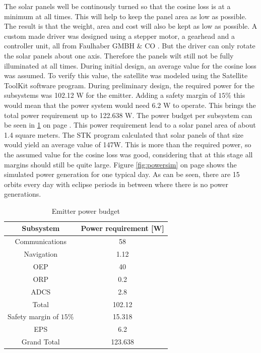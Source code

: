 The solar panels well be continously turned so that the cosine loss is at a minimum at all times. This will help to keep the panel area as low as possible. The result is that the weight, area and cost will also be kept as low as possible. A custom made driver was designed using a stepper motor, a gearhead and a controller unit, all from Faulhaber GMBH $\&$ CO \cite{faulhaber}. But the driver can only rotate the solar panels about one axis. Therefore the panels wilt still not be fully illuminated at all times. During initial design, an average value for the cosine loss was assumed. To verify this value, the satellite was modeled using the Satellite ToolKit software program. During preliminary design, the required power for the subsystems was 102.12 W for the emitter. Adding a safety margin of $15\%$ this would mean that the power system would need 6.2 W to operate. This brings the total power requirement up to 122.638 W. The power budget per subsystem can be seen in \ref{tab:emitterPowerBudget} on page \pageref{tab:emitterPowerBudget}. This power requirement lead to a solar panel area of about 1.4 square meters. The STK program calculated that solar panels of that size would yield an average value of 147W. This is more than the required power, so the assumed value for the cosine loss was good, considering that at this stage all margins should still be quite large.  Figure \ref{fig:powersim} on page \pageref{fig:powersim} shows the simulated power generation for one typical day. As can be seen, there are 15 orbits every day with eclipse periods in between where there is no power generations.

\begin{table}
\centering
\begin{tabular}{cc}
\hline
Subsystem & Power requirement [W]\\
\midrule
Communications & 58\\
Navigation & 1.12\\
OEP & 40\\
ORP & 0.2\\
ADCS & 2.8\\
\midrule
Total & 102.12\\
Safety margin of $15\%$ & 15.318\\
EPS & 6.2\\
\midrule
\midrule
Grand Total & 123.638\\
\hline
\end{tabular}
\caption{Emitter power budget}
\label{tab:emitterPowerBudget}
\end{table}

